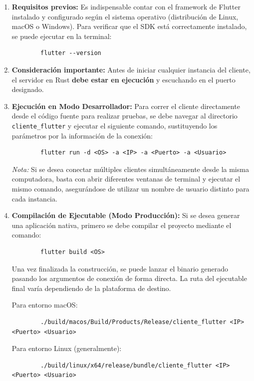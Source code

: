 \begin{enumerate}
    \item \textbf{Requisitos previos:} Es indispensable contar con el framework de Flutter instalado y configurado según el sistema operativo (distribución de Linux, macOS o Windows). Para verificar que el SDK está correctamente instalado, se puede ejecutar en la terminal:
    \begin{lstlisting}
        flutter --version
    \end{lstlisting}

        \item \textbf{Consideración importante:} Antes de iniciar cualquier instancia del cliente, el servidor en Rust \textbf{debe estar en ejecución} y escuchando en el puerto designado.

        \item \textbf{Ejecución en Modo Desarrollador:} Para correr el cliente directamente desde el código fuente para realizar pruebas, se debe navegar al directorio \texttt{cliente\_flutter} y ejecutar el siguiente comando, sustituyendo los parámetros por la información de la conexión:
    \begin{lstlisting}
        flutter run -d <OS> -a <IP> -a <Puerto> -a <Usuario>
    \end{lstlisting}
        \textit{Nota:} Si se desea conectar múltiples clientes simultáneamente desde la misma computadora, basta con abrir diferentes ventanas de terminal y ejecutar el mismo comando, asegurándose de utilizar un nombre de usuario distinto para cada instancia.

        \item \textbf{Compilación de Ejecutable (Modo Producción):} Si se desea generar una aplicación nativa, primero se debe compilar el proyecto mediante el comando:
    \begin{lstlisting}
        flutter build <OS>
    \end{lstlisting}
        
        Una vez finalizada la construcción, se puede lanzar el binario generado pasando los argumentos de conexión de forma directa. La ruta del ejecutable final varía dependiendo de la plataforma de destino.
        
        Para entorno macOS:
    \begin{lstlisting}
        ./build/macos/Build/Products/Release/cliente_flutter <IP> <Puerto> <Usuario>
    \end{lstlisting}
        
        Para entorno Linux (generalmente):
    \begin{lstlisting}
        ./build/linux/x64/release/bundle/cliente_flutter <IP> <Puerto> <Usuario>
    \end{lstlisting}
\end{enumerate}
